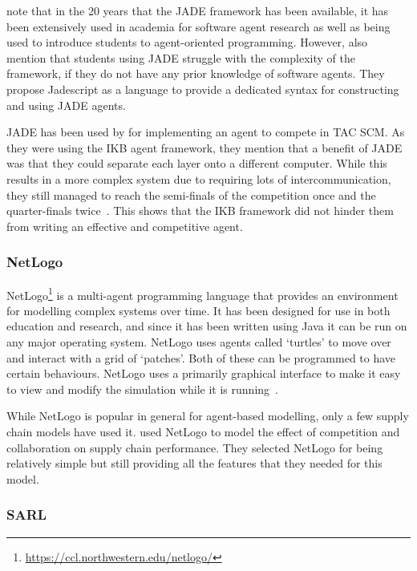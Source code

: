  note that in the 20 years that the JADE framework has been available, it has been extensively used in academia for software agent research as well as being used to introduce students to agent-oriented programming.
However,  also mention that students using JADE struggle with the complexity of the framework, if they do not have any prior knowledge of software agents.
They propose Jadescript as a language to provide a dedicated syntax for constructing and using JADE agents.

JADE has been used by  for implementing an agent to compete in TAC SCM\@.
As they were using the IKB agent framework, they mention that a benefit of JADE was that they could separate each layer onto a different computer.
While this results in a more complex system due to requiring lots of intercommunication, they still managed to reach the semi-finals of the competition once and the quarter-finals twice~\cite{collins2009flexible}.
This shows that the IKB framework did not hinder them from writing an effective and competitive agent.

\subsubsection{NetLogo}

NetLogo\footnote{\url{https://ccl.northwestern.edu/netlogo/}} is a multi-agent programming language that provides an environment for modelling complex systems over time.
It has been designed for use in both education and research, and since it has been written using Java it can be run on any major operating system.
NetLogo uses agents called `turtles' to move over and interact with a grid of `patches'.
Both of these can be programmed to have certain behaviours.
NetLogo uses a primarily graphical interface to make it easy to view and modify the simulation while it is running~\cite{tisue2004netlogo}.

While NetLogo is popular in general for agent-based modelling, only a few supply chain models have used it.
 used NetLogo to model the effect of competition and collaboration on supply chain performance.
They selected NetLogo for being relatively simple but still providing all the features that they needed for this model.

\subsubsection{SARL}

